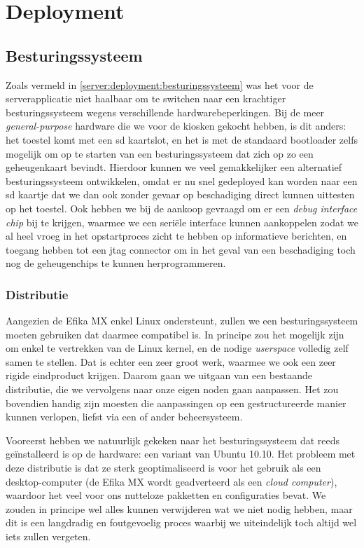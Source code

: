 \chapter{Deployment}
\label{kiosk:deployment}

\section{Besturingssysteem}
\label{kiosk:deployment:besturingssysteem}

Zoals vermeld in \ref{server:deployment:besturingssysteem} was het voor de serverapplicatie niet haalbaar om te switchen naar een krachtiger besturingssysteem wegens verschillende hardwarebeperkingen. Bij de meer \emph{general-purpose} hardware die we voor de kiosken gekocht hebben, is dit anders: het toestel komt met een \ac{sd} kaartslot, en het is met de standaard bootloader zelfs mogelijk om op te starten van een besturingssysteem dat zich op zo een geheugenkaart bevindt. Hierdoor kunnen we veel gemakkelijker een alternatief besturingssysteem ontwikkelen, omdat er nu snel gedeployed kan worden naar een \ac{sd} kaartje dat we dan ook zonder gevaar op beschadiging direct kunnen uittesten op het toestel. Ook hebben we bij de aankoop gevraagd om er een \emph{debug interface chip} bij te krijgen, waarmee we een seriële interface kunnen aankoppelen zodat we al heel vroeg in het opstartproces zicht te hebben op informatieve berichten, en toegang hebben tot een \ac{jtag} connector om in het geval van een beschadiging toch nog de geheugenchips te kunnen herprogrammeren.

\subsection{Distributie}
\label{kiosk:deployment:besturingssysteem:distributie}

Aangezien de Efika MX enkel Linux ondersteunt, zullen we een besturingssysteem moeten gebruiken dat daarmee compatibel is. In principe zou het mogelijk zijn om enkel te vertrekken van de Linux kernel, en de nodige \emph{userspace} volledig zelf samen te stellen. Dat is echter een zeer groot werk, waarmee we ook een zeer rigide eindproduct krijgen. Daarom gaan we uitgaan van een bestaande distributie, die we vervolgens naar onze eigen noden gaan aanpassen. Het zou bovendien handig zijn moesten die aanpassingen op een gestructureerde manier kunnen verlopen, liefst via een of ander beheersysteem.

Vooreerst hebben we natuurlijk gekeken naar het besturingssysteem dat reeds geïnstalleerd is op de hardware: een variant van Ubuntu 10.10. Het probleem met deze distributie is dat ze sterk geoptimaliseerd is voor het gebruik als een desktop-computer (de Efika MX wordt geadverteerd als een \emph{cloud computer}), waardoor het veel voor ons nutteloze pakketten en configuraties bevat. We zouden in principe wel alles kunnen verwijderen wat we niet nodig hebben, maar dit is een langdradig en foutgevoelig proces waarbij we uiteindelijk toch altijd wel iets zullen vergeten.

